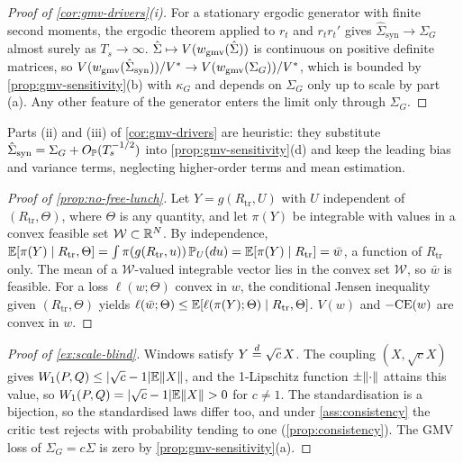 \begin{proof}[Proof of \cref{cor:gmv-drivers}(i)]
For a stationary ergodic generator with finite second moments, the ergodic theorem applied to
$r_t$ and $r_tr_t'$ gives $\hat\Sigma_{\mathrm{syn}}\to\Sigma_G$ almost surely as $T_s\to\infty$.
$\hat\Sigma\mapsto V(w_{\mathrm{gmv}}(\hat\Sigma))$ is continuous on positive definite matrices, so
$V(w_{\mathrm{gmv}}(\hat\Sigma_{\mathrm{syn}}))/V^*\to V(w_{\mathrm{gmv}}(\Sigma_G))/V^*$, which is bounded by
\cref{prop:gmv-sensitivity}(b) with $\kappa_G$ and depends on $\Sigma_G$ only up to scale by part
(a). Any other feature of the generator enters the limit only through $\Sigma_G$.
\end{proof}

Parts (ii) and (iii) of \cref{cor:gmv-drivers} are heuristic: they substitute
$\hat\Sigma_{\mathrm{syn}}=\Sigma_G+O_{\mathbb{P}}(T_s^{-1/2})$ into \cref{prop:gmv-sensitivity}(d) and
keep the leading bias and variance terms, neglecting higher-order terms and mean estimation.

\begin{proof}[Proof of \cref{prop:no-free-lunch}]
Let $Y=g(R_{\mathrm{tr}},U)$ with $U$ independent of $(R_{\mathrm{tr}},\Theta)$, where $\Theta$
is any \TEST{} quantity, and let $\pi(Y)$ be integrable with values in a convex feasible set
$\mathcal W\subset\mathbb{R}^N$. By independence,
$\mathbb{E}[\pi(Y)\mid R_{\mathrm{tr}},\Theta]=\int\pi(g(R_{\mathrm{tr}},u))\,\mathbb{P}_U(du)=\mathbb{E}[\pi(Y)\mid R_{\mathrm{tr}}]=\bar w$,
a function of $R_{\mathrm{tr}}$ only. The mean of a $\mathcal W$-valued integrable vector lies in
the convex set $\mathcal W$, so $\bar w$ is feasible. For a loss $\ell(w;\Theta)$ convex in $w$,
the conditional Jensen inequality given $(R_{\mathrm{tr}},\Theta)$ yields
$\ell(\bar w;\Theta)\le\mathbb{E}[\ell(\pi(Y);\Theta)\mid R_{\mathrm{tr}},\Theta]$.
$V(w)$ and $-\mathrm{CE}(w)$ are convex in $w$.
\end{proof}

\begin{proof}[Proof of \cref{ex:scale-blind}]
Windows satisfy $Y\overset{d}{=}\sqrt c\,X$. The coupling $(X,\sqrt cX)$ gives
$W_{1}(P,Q)\le\lvert\sqrt c-1\rvert\mathbb{E}\lVert X\rVert$, and the 1-Lipschitz function $\pm\lVert\cdot\rVert$ attains this
value, so $W_{1}(P,Q)=\lvert\sqrt c-1\rvert\mathbb{E}\lVert X\rVert>0$ for $c\neq1$. The standardisation is a bijection, so
the standardised laws differ too, and under \cref{ass:consistency} the critic test rejects with
probability tending to one (\cref{prop:consistency}). The GMV loss of $\Sigma_G=c\Sigma$ is zero by
\cref{prop:gmv-sensitivity}(a).
\end{proof}

